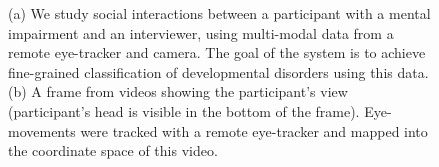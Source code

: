 \documentclass{llncs}
\begin{document}
\begin{figure}%
               \hfill   
		
\label{fig:pull_figure}           
\caption{(a) We study social interactions between a participant with a mental impairment and an interviewer, using multi-modal data from a remote eye-tracker and camera. The goal of the system is to achieve fine-grained classification of developmental disorders using this data. (b) A frame from videos showing the participant's view (participant's head is visible in the bottom of the frame). Eye-movements were tracked with a remote eye-tracker and mapped into the coordinate space of this video.
}
\end{figure} 
\vspace{-3em} 
\end{document}
